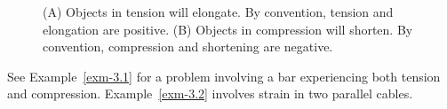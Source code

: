 \documentclass[
  letterpaper,
  DIV=11,
  numbers=noendperiod]{scrreprt}
\theoremstyle{definition}
\theoremstyle{remark}
\begin{document}
\begin{figure}


\caption{\label{fig-3.3}(A) Objects in tension will elongate. By
convention, tension and elongation are positive. (B) Objects in
compression will shorten. By convention, compression and shortening are
negative.}

\end{figure}%

See Example~\ref{exm-3.1} for a problem involving a bar experiencing
both tension and compression. Example~\ref{exm-3.2} involves strain in
two parallel cables.
\end{document}
